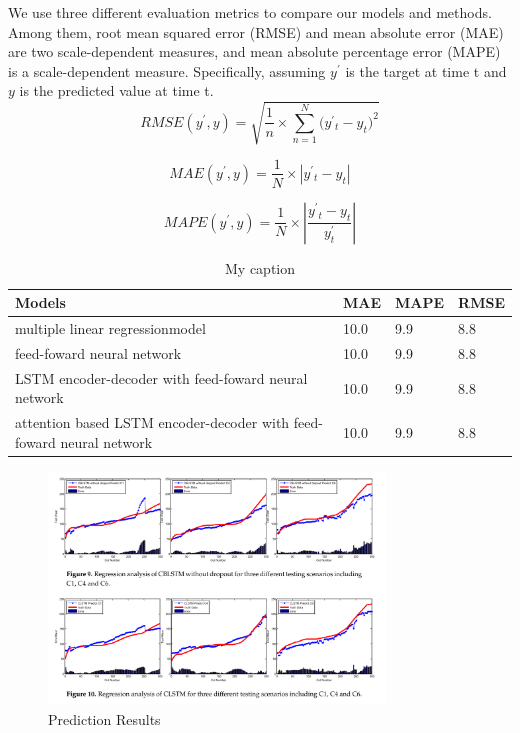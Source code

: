 \documentclass[5p]{elsarticle}
\begin{document}
We use three different evaluation metrics to compare our models and methods. Among them, root mean squared error (RMSE) and mean absolute error (MAE) are two scale-dependent measures, and mean absolute percentage error (MAPE) is a scale-dependent measure. Specifically, assuming $y^'$ is the target at time t and $y$ is the predicted value at time t. 
\begin{equation}
    RMSE(y^{'},y)=\sqrt{\frac{1}{n}\times{\sum_{n=1}^N(y^{'}{_t}-y_t})^2}
\end{equation}

\begin{equation}
	 MAE(y^{'},y)=\frac{1}{N}\times\left| y^{'}{_t}-y_t \right|
\end{equation}

\begin{equation}
	 MAPE(y^{'},y)=\frac{1}{N}\times\left| \frac{y^{'}{_t}-y_t}{y^'_t} \right|
\end{equation}

\begin{table}[]
\centering
\caption{My caption}
\label{my-label}
\begin{tabular}{|l|l|l|l|}
\hline
Models & MAE & MAPE & RMSE\\
\hline
multiple linear regressionmodel & 10.0 & 9.9  & 8.8 \\
\hline
feed-foward neural network & 10.0 & 9.9  & 8.8 \\
\hline
LSTM encoder-decoder with feed-foward neural network& 10.0 & 9.9  & 8.8 \\
\hline
attention based LSTM encoder-decoder with feed-foward neural network & 10.0 & 9.9  & 8.8\\    
\hline 
\end{tabular}
\end{table}

\begin{figure}[h]
    \centering
    \includegraphics[width=0.8\textwidth]{experiment_results.png}
    \caption{Prediction Results}
    \label{fig:Prediction Results}
\end{figure}
\end{document}
